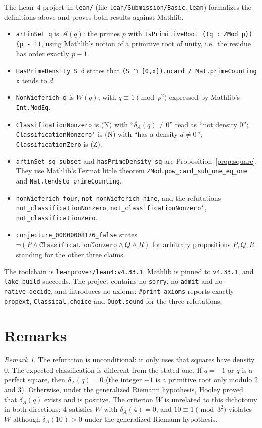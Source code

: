 \documentclass[11pt]{article}
\theoremstyle{plain}
\theoremstyle{definition}
\theoremstyle{remark}
\newtheorem{remark}[theorem]{Remark}
\begin{document}
The Lean~4 project in \texttt{lean/} (file \texttt{lean/Submission/Basic.lean})
formalizes the definitions above and proves both results against Mathlib.
\begin{itemize}
  \item \texttt{artinSet q} is $\mathcal A(q)$: the primes $p$ with
    \texttt{IsPrimitiveRoot ((q : ZMod p)) (p - 1)}, using Mathlib's notion of a
    primitive root of unity, i.e.\ the residue has order exactly $p-1$.
  \item \texttt{HasPrimeDensity S d} states that
    \texttt{(S $\cap$ [0,x]).ncard / Nat.primeCounting x} tends to $d$.
  \item \texttt{NonWieferich q} is $W(q)$, with $q\equiv1\pmod{p^2}$ expressed by
    Mathlib's \texttt{Int.ModEq}.
  \item \texttt{ClassificationNonzero} is (N) with ``$\delta_A(q)\ne0$'' read as
    ``not density $0$''; \texttt{ClassificationNonzero'} is (N) with ``has a
    density $d\ne0$''; \texttt{ClassificationZero} is (Z).
  \item \texttt{artinSet\_sq\_subset} and \texttt{hasPrimeDensity\_sq} are
    Proposition~\ref{prop:square}. They use Mathlib's Fermat little theorem
    \texttt{ZMod.pow\_card\_sub\_one\_eq\_one} and
    \texttt{Nat.tendsto\_primeCounting}.
  \item \texttt{nonWieferich\_four}, \texttt{not\_nonWieferich\_nine}, and the
    refutations \texttt{not\_classificationNonzero},
    \texttt{not\_classificationNonzero'}, \texttt{not\_classificationZero}.
  \item \texttt{conjecture\_00000008176\_false} states
    $\lnot(P\wedge\texttt{ClassificationNonzero}\wedge Q\wedge R)$ for arbitrary
    propositions $P,Q,R$ standing for the other three claims.
\end{itemize}
The toolchain is \texttt{leanprover/lean4:v4.33.1}, Mathlib is pinned to
\texttt{v4.33.1}, and \texttt{lake build} succeeds. The project contains no
\texttt{sorry}, no \texttt{admit} and no \texttt{native\_decide}, and introduces no
axioms: \texttt{\#print axioms} reports exactly \texttt{propext},
\texttt{Classical.choice} and \texttt{Quot.sound} for the three refutations.

\fussy
\section{Remarks}

\begin{remark}
The refutation is unconditional: it only uses that squares have density $0$. The
expected classification is different from the stated one. If $q=-1$ or $q$ is a
perfect square, then $\delta_A(q)=0$ (the integer $-1$ is a primitive root only
modulo $2$ and $3$). Otherwise, under the generalized Riemann hypothesis, Hooley
\cite{hooley} proved that $\delta_A(q)$ exists and is positive. The criterion $W$ is
unrelated to this dichotomy in both directions: $4$ satisfies $W$ with
$\delta_A(4)=0$, and $10\equiv1\pmod{3^2}$ violates $W$ although $\delta_A(10)>0$
under the generalized Riemann hypothesis.
\end{remark}
\end{document}
